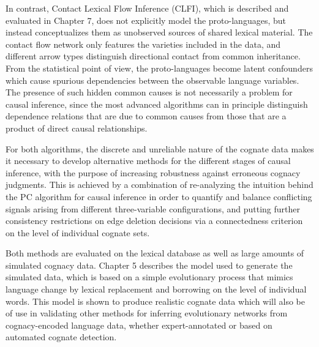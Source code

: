 In contrast, Contact Lexical Flow Inference (CLFI), which is described and evaluated in Chapter 7, does not explicitly model the proto-languages, but instead conceptualizes them as unobserved sources of shared lexical material. The contact flow network only features the varieties included in the data, and different arrow types distinguish directional contact from common inheritance. From the statistical point of view, the proto-languages become latent confounders which cause spurious dependencies between the observable language variables. The presence of such hidden common causes is not necessarily a problem for causal inference, since the most advanced algorithms can in principle distinguish dependence relations that are due to common causes from those that are a product of direct causal relationships.

For both algorithms, the discrete and unreliable nature of the cognate data makes it necessary to develop alternative methods for the different stages of causal inference, with the purpose of increasing robustness against erroneous cognacy judgments. This is achieved by a combination of re-analyzing the intuition behind the PC algorithm for causal inference in order to quantify and balance conflicting signals arising from different three-variable configurations, and putting further consistency restrictions on edge deletion decisions via a connectedness criterion on the level of individual cognate sets.

Both methods are evaluated on the lexical database as well as large amounts of simulated cognacy data. Chapter 5 describes the model used to generate the simulated data, which is based on a simple evolutionary process that mimics language change by lexical replacement and borrowing on the level of individual words. This model is shown to produce realistic cognate data which will also be of use in validating other methods for inferring evolutionary networks from cognacy-encoded language data, whether expert-annotated or based on automated cognate detection.
